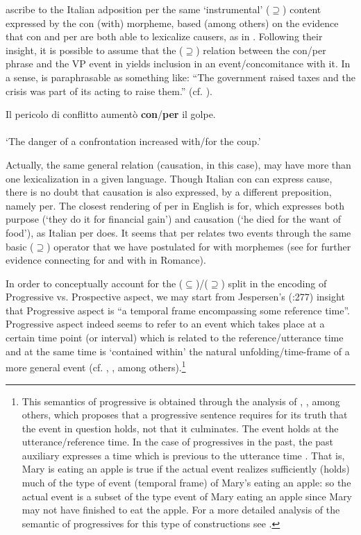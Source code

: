 \documentclass[output=paper,modfonts,nonflat,newtxmath,colorlinks,citecolor=brown]{langsci/langscibook}
\begin{document}
\citet{FrancoManzini2017Ins} ascribe to the Italian adposition {per} the same ‘instrumental’ (${\supseteq}$) content expressed by the {con} (with) morpheme, based (among others) on the evidence that {con} and {per} are both able to lexicalize causers, as in . Following their insight, it is possible to assume that the (${\supseteq}$) relation between the {con/per} phrase and the VP event in  yields inclusion in an event/concomitance with it. In a sense,  is paraphrasable as something like: “The government raised taxes and the crisis was part of its acting to raise them.” (cf. \citealt[8-9]{FrancoManzini2017Ins}).

\ea%
    \label{ex:franco:24}
    \gll  Il pericolo di conflitto aumentò \textbf{con}/\textbf{per} il golpe.\\
        \\
    \glt  ‘The danger of a confrontation increased with/for the coup.’
    \z

Actually, the same general relation (causation, in this case), may have more than one lexicalization in a given language. Though Italian {con} can express cause, there is no doubt that causation is also expressed, by a different preposition, namely {per}. The closest rendering of {per} in English is {for}, which expresses both purpose (‘they do it for financial gain’) and causation (‘he died for the want of food’), as Italian {per} does. It seems that {per} relates two events through the same basic (${\supseteq}$) operator that we have postulated for {with} morphemes (see \citealt[26-27]{FrancoManzini2017Ins} for further evidence connecting {for} and {with} in Romance).

In order to conceptually account for the (${\subseteq}$)/(${\supseteq}$) split in the encoding of Progressive {vs}. Prospective aspect, we may start from Jespersen’s (\citeyear{Jespersen1924}:277) insight that Progressive aspect is “a temporal frame encompassing some reference time”. Progressive aspect indeed seems to refer to an event which takes place at a certain time point (or interval) which is related to the reference/utterance time and at the same time is  ‘contained within’ the natural unfolding/time-frame of a more general event (cf. \citealt{Dowty1979}, \citealt{Higginbotham2004}, among others).\footnote{This semantics of progressive is obtained through the analysis of \citet{Higginbotham2009}, \citet{Parsons1989}, \citet{Landman1992} among others, which proposes that a progressive sentence requires for its truth that the event in question {holds}, not that it {culminates}. The event holds at the utterance/reference time. In the case of progressives in the past, the past auxiliary expresses a time which is previous to the utterance time \citep{Higginbotham2009}. That is, {Mary is eating an apple} is true if the actual event realizes sufficiently (holds) much of the type of event (temporal frame) of {Mary’s eating an apple}: so the actual event is a subset of the type event of {Mary eating an appl}e since Mary may not have finished to eat the apple. For a more detailed analysis of the semantic of progressives for this type of constructions see \citet{ManziniEtAl2017}.}  
\end{document}
